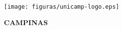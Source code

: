 \texttt{[image: figuras/unicamp-logo.eps]}
\vspace*{1cm}
\begin{center}
    {\Large \scshape \autor}
\end{center}
\vspace{4cm}
\begin{center}
    {\Large \scshape \bfseries \titulo}
\end{center}
\vfill
\begin{center}
    {\bfseries CAMPINAS \\ \ano}
\end{center}
